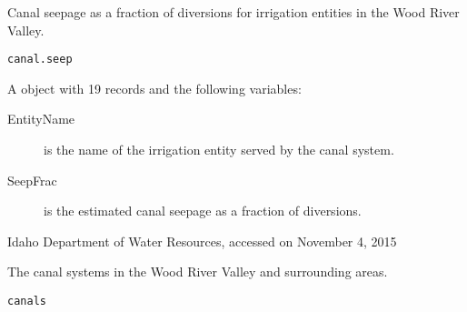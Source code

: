 \documentclass[letterpaper]{book}
\begin{document}
%
\begin{Description}\relax
Canal seepage as a fraction of diversions for irrigation entities in the Wood River Valley.
\end{Description}
%
\begin{Usage}
\begin{verbatim}
canal.seep
\end{verbatim}
\end{Usage}
%
\begin{Format}
A  object with 19 records and the following variables:
\begin{description}

\item[EntityName] is the name of the irrigation entity served by the canal system.
\item[SeepFrac] is the estimated canal seepage as a fraction of diversions.

\end{description}

\end{Format}
%
\begin{Source}\relax
Idaho Department of Water Resources, accessed on November 4, 2015
\end{Source}
%
\begin{SeeAlso}\relax
{}
\end{SeeAlso}
%
\begin{Examples}
\end{Examples}
%
\begin{Description}\relax
The canal systems in the Wood River Valley and surrounding areas.
\end{Description}
%
\begin{Usage}
\begin{verbatim}
canals
\end{verbatim}
\end{Usage}
\end{document}
